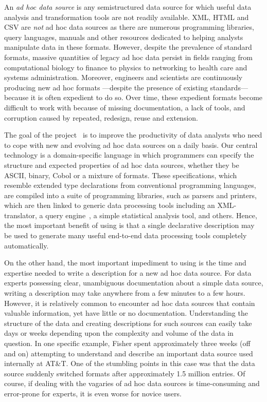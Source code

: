 
An {\em ad hoc data source} is any semistructured data source
for which useful data analysis and transformation tools
are not readily available. XML, HTML and CSV are {\em not} 
ad hoc data sources as there are numerous programming libraries,
query languages, manuals and other resources dedicated to
helping analysts manipulate data in these formats.
However, despite the prevalence of standard formats,
massive quantities of legacy ad hoc data persist in fields ranging from
computational biology to finance to physics to networking to health care and
systems administration.  Moreover, engineers and scientists are continuously
producing new ad hoc formats ---despite the presence of existing 
standards--- because it is often expedient to do so.  Over time, these
expedient formats become difficult to work with because of missing
documentation, a lack of tools, and corruption caused by repeated,
redesign, reuse and extension.

The goal of the \pads{}
project~\cite{fisher+:pads,fisher+:popl06,mandelbaum+:pads-ml,padsweb}
is to improve the productivity of data analysts who need to cope with
new and evolving ad hoc data sources on a daily basis.  Our central
technology is a domain-specific language in which programmers can
specify the structure and expected properties of ad hoc data sources,
whether they be ASCII, binary, Cobol or a mixture of formats.  These
specifications, which resemble extended type declarations from
conventional programming languages, are compiled into a suite of
programming libraries, such as parsers and printers, which are then
linked to generic 
data processing tools including an XML-translator, a query
engine~\cite{fernandez+:padx}, a 
simple statistical analysis tool, and others.  Hence, the most important
benefit of using \pads{} is that  a single declarative description
may be used to generate many useful end-to-end data processing tools completely
automatically.

On the other hand, the most important impediment to using \pads{}
is the time and expertise needed
to write a \pads{} description for a new ad hoc data source.
For data experts possessing clear, unambiguous documentation about a
simple data source, writing a \pads{} description may take 
anywhere from a few minutes to a few hours.  However,
it is relatively common to encounter ad hoc data sources that 
contain valuable information, yet have little or no documentation.
Understanding the structure of the data and creating descriptions for such 
sources can easily take days or weeks depending upon the complexity
and volume of the data in question.  In one specific example, Fisher
spent approximately three weeks (off and on) attempting to understand
and describe an important data source used internally at AT\&T.  One
of the stumbling points in this case was that the data source suddenly 
switched formats after approximately 1.5 million entries.  Of course,
if dealing with the vagaries of ad hoc data sources is
time-consuming and error-prone for experts, it is even worse for
novice users.

